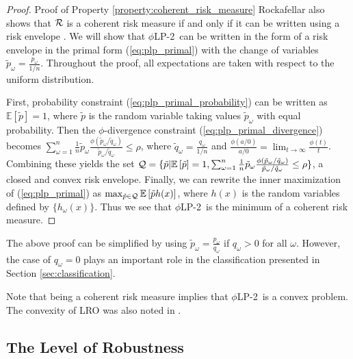 \documentclass[opre,nonblindrev]{informs3} %
\newcommand{\E}{\mathbb{E}}
\newcommand{\e}[1]{\E \left[ #1 \right]}
\newcommand{\plp}{$\phi$LP-2}
\begin{document}
\begin{proof}{\sc Proof of Property \ref{property:coherent_risk_measure}}
	Rockafellar also shows that $\cal R$ is a coherent risk measure if and only if it can be written using a risk envelope \citep{rockafellar2007coherent}.
	We will show that \plp\ can be written in the form of a risk envelope in the primal form (\ref{eq:plp_primal}) with the change of variables $\tilde{p}_\omega = \frac{p_\omega}{1/n}$.
	Throughout the proof, all expectations are taken with respect to the uniform distribution.
	
	First, probability constraint (\ref{eq:plp_primal_probability}) can be written as $\e{\tilde{p}} = 1$, where $\tilde{p}$ is the random variable taking values $\tilde{p}_\omega$ with equal probability.
	Then the $\phi$-divergence constraint (\ref{eq:plp_primal_divergence}) becomes $\sum_{\omega=1}^n \frac{1}{n} \tilde{p}_\omega \frac{\phi\left(\tilde{p}_\omega/\tilde{q}_\omega\right)}{\tilde{p}_\omega/\tilde{q}_\omega} \leq \rho$, where $\tilde{q}_\omega = \frac{q_\omega}{1/n}$ and $\frac{\phi(a/0)}{a/0} = \lim_{t \rightarrow \infty} \frac{\phi(t)}{t}$.
	Combining these yields the set ${\cal Q} = \{\tilde{p} | \e{\tilde{p}} = 1, \sum_{\omega=1}^n \frac{1}{n} \tilde{p}_\omega \frac{\phi\left(\tilde{p}_\omega/\tilde{q}_\omega\right)}{\tilde{p}_\omega/\tilde{q}_\omega} \leq \rho \}$, a closed and convex risk envelope.
	Finally, we can rewrite the inner maximization of (\ref{eq:plp_primal}) as $\max_{\tilde{p} \in {\cal Q}} \e{\tilde{p} h(x)}$, where $h(x)$ is the random variables defined by $\{h_\omega(x)\}$.
	Thus we see that \plp\ is the minimum of a coherent risk measure.
\end{proof}

\begin{remark}
	The above proof can be simplified by using $\tilde{p}_\omega = \frac{p_\omega}{q_\omega}$ if $q_\omega > 0$ for all $\omega$.
	However, the case of $q_\omega = 0$ plays an important role in the classification presented in Section \ref{sec:classification}.
\end{remark}

Note that being a coherent risk measure implies that \plp\ is a convex problem.
The convexity of LRO was also noted in \citep{wang2010likelihood}.


\subsection{The Level of Robustness}
\label{ssec:robust_level}
\end{document}
